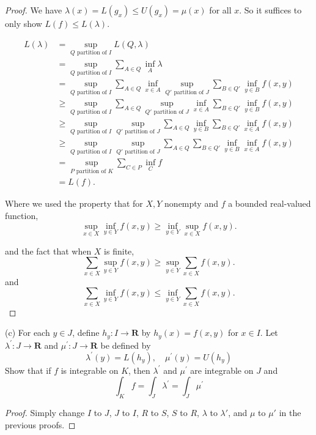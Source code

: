 \begin{itemize}
\begin{proof}
	We have $\lambda(x) = L(g_x) \le U(g_x) = \mu(x)$ for all $x$. So it suffices to only show $L(f) \le L(\lambda)$.

	\begin{align*}
		L(\lambda)
		&= \sup _{Q \text{ partition of }I}L(Q, \lambda)\\
		&= \sup _{Q\text{ partition of }I}\sum_{A \in Q} \inf_{A} \lambda\\
		&= \sup _{Q\text{ partition of }I}\sum_{A \in Q} \inf_{x \in A} \sup_{Q' \text{ partition of }J} \sum_{B \in Q'} \inf_{y \in B} f(x,y)\\
		&\ge  \sup _{Q\text{ partition of }I}\sum_{A \in Q} \sup_{Q' \text{ partition of }J} \inf_{x \in A}\sum_{B \in Q'}  \inf_{y \in B} f(x,y)\\
		&\ge  \sup _{Q\text{ partition of }I} \sup_{Q' \text{ partition of }J} \sum_{A \in Q}\inf_{y \in B} \sum_{B \in Q'}\inf_{x \in A}  f(x,y)\\
		&\ge  \sup _{Q\text{ partition of }I} \sup_{Q' \text{ partition of }J} \sum_{A \in Q}\sum_{B \in Q'}\inf_{y \in B} \inf_{x \in A}  f(x,y)\\
		&= \sup _{P \text{ partition of }K} \sum_{C \in P} \inf_C f\\
		&= L(f)
	.\end{align*}

	Where we used the property that for $X, Y$ nonempty and $f$ a bounded real-valued function,
	\[
		\sup_{x \in X} \inf_{y \in Y} f(x,y) \ge 
		 \inf_{y \in Y}\sup_{x \in X} f(x,y) 
	.\] 

	and the fact that when $X$ is finite,
	\[
		\sum_{x \in X} \sup_{y \in Y} f(x,y) \ge \sup_{y \in Y} \sum_{x \in X} f(x,y)
	.\] 
	and
\[
		\sum_{x \in X} \inf_{y \in Y} f(x,y) \le \inf_{y \in Y} \sum_{x \in X} f(x,y)
	.\]
\end{proof}

(c) For each $y \in J$, define $h_y: I \rightarrow \boldsymbol{R}$ by $h_y(x)=f(x, y)$ for $x \in I$. Let $\lambda^{\prime}: J \rightarrow \boldsymbol{R}$ and $\mu^{\prime}: J \rightarrow \boldsymbol{R}$ be defined by
\[
\lambda^{\prime}(y)=L\left(h_y\right), \quad \mu^{\prime}(y)=U\left(h_y\right)
\]
Show that if $f$ is integrable on $K$, then $\lambda^{\prime}$ and $\mu^{\prime}$ are integrable on $J$ and
\[
\int_K f=\int_J \lambda^{\prime}=\int_J \mu^{\prime}
\]
\begin{proof}
	Simply change $I$ to $J$, $J$ to $I$, $R$ to $S$, $S$ to $R$, $\lambda$ to $\lambda'$, and $\mu$ to $\mu'$ in the previous proofs.
\end{proof}


\end{itemize}
